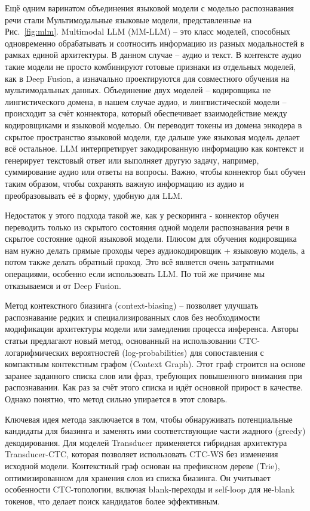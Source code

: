 Ещё одним варинатом объединения языковой модели с моделью распознавания речи стали Мультимодальные языковые модели, представленные на Рис.~\ref{fig:mlm}.
Multimodal LLM (MM-LLM) -- это класс моделей, способных одновременно обрабатывать и соотносить информацию из разных модальностей в рамках единой архитектуры.
В данном случае -- аудио и текст.
В контексте аудио такие модели не просто комбинируют готовые признаки из отдельных моделей, как в Deep Fusion, а изначально проектируются для совместного обучения на мультимодальных данных.
Объединение двух моделей -- кодировщика не лингистического домена, в нашем случае аудио, и лингвистической модели -- происходит за счёт коннектора, который обеспечивает взаимодействие между кодировщиками и языковой моделью.
Он переводит токены из домена энкодера в скрытое пространство языковой модели, где дальше уже языковая модель делает всё остальное.
LLM интерпретирует закодированную информацию как контекст и генерирует текстовый ответ или выполняет другую задачу, например, суммирование аудио или ответы на вопросы.
Важно, чтобы коннектор был обучен таким образом, чтобы сохранять важную информацию из аудио и преобразовывать её в форму, удобную для LLM.

Недостаток у этого подхода такой же, как у рескоринга - коннектор обучен переводить только из скрытого состояния одной модели распознавания речи в скрытое состояние одной языковой модели.
Плюсом для обучения кодировщика нам нужно делать прямые проходы через аудиокодировщик + языковую модель, а потом также делать обратный проход.
Это всё является очень затратными операциями, особенно если использовать LLM.
По той же причине мы отказываемся и от Deep Fusion.

Метод контекстного биазинга (context-biasing) --  позволяет улучшать распознавание редких и специализированных слов без необходимости модификации архитектуры модели или замедления процесса инференса.
Авторы статьи предлагают новый метод, основанный на использовании CTC-логарифмических вероятностей (log-probabilities) для сопоставления с компактным контекстным графом (Context Graph).
Этот граф строится на основе заранее заданного списка слов или фраз, требующих повышенного внимания при распознавании.
Как раз за счёт этого списка и идёт основной прирост в качестве.
Однако понятно, что метод сильно упирается в этот словарь.

Ключевая идея метода заключается в том, чтобы обнаруживать потенциальные кандидаты для биазинга и заменять ими соответствующие части жадного (greedy) декодирования.
Для моделей Transducer применяется гибридная архитектура Transducer-CTC, которая позволяет использовать CTC-WS без изменения исходной модели.
Контекстный граф основан на префиксном дереве (Trie), оптимизированном для хранения слов из списка биазинга.
Он учитывает особенности CTC-топологии, включая blank-переходы и self-loop для не-blank токенов, что делает поиск кандидатов более эффективным.

